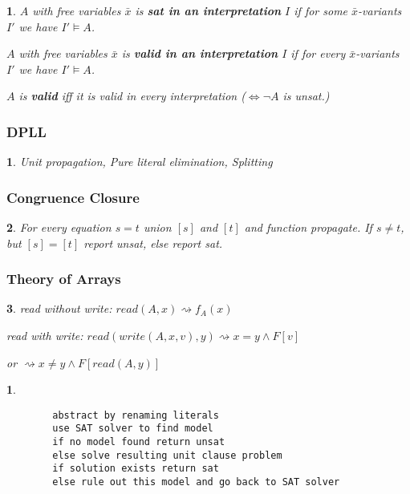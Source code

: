 \documentclass[9pt]{extarticle}
\theoremstyle{theoremstyle}
\newtheorem*{green}{}
\newtheorem*{red}{}
\newtheorem*{blue}{}
\begin{document}
\begin{multicols}{3}
\begin{minipage}[t]{.30\textwidth}
\begin{green}
$A$ with free variables $\bar{x}$ is \textbf{sat in an interpretation} $I$ if for some $\bar{x}$-variants $I'$ we have $I'\models A$.

$A$ with free variables $\bar{x}$ is \textbf{valid in an interpretation} $I$ if for every $\bar{x}$-variants $I'$ we have $I'\models A$.

$A$ is \textbf{valid} iff it is valid in every interpretation ($\iff \lnot A$ is unsat.)
\end{green}

\subsubsection*{DPLL}
\begin{blue}
	Unit propagation, Pure literal elimination, Splitting
\end{blue}

\subsubsection*{Congruence Closure}
\begin{blue}
	For every equation $s=t$ union $[s]$ and $[t]$ and function propagate. If $s \not= t$, but $[s] = [t]$ report unsat, else report sat.
\end{blue}

\subsubsection*{Theory of Arrays}
\begin{blue}
	read without write: $read(A,x) \rightsquigarrow f_A(x)$
	
	read with write: $read(write(A,x,v),y) \rightsquigarrow x=y \land F[v]$
	
	or \hspace{4cm} $\rightsquigarrow x\not= y \land F[read(A,y)]$
\end{blue}



\end{minipage}\hfil

\begin{minipage}[t]{.30\textwidth}

\begin{red}
	\begin{verbatim}
		abstract by renaming literals
		use SAT solver to find model
		if no model found return unsat
		else solve resulting unit clause problem
		if solution exists return sat
		else rule out this model and go back to SAT solver
	\end{verbatim}
\end{red}


\end{minipage}
\end{multicols}
\end{document}
